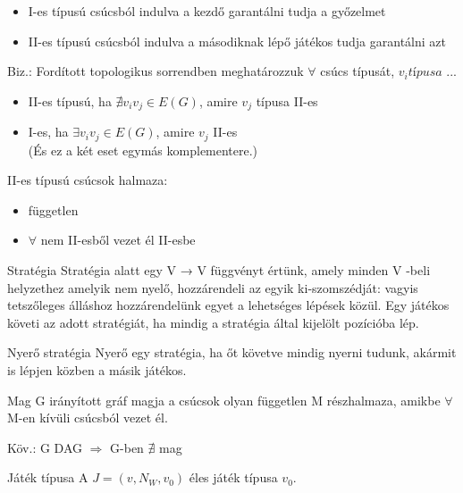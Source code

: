 \begin{itemize}
    \item I-es típusú csúcsból indulva a kezdő garantálni tudja a győzelmet
    \item II-es típusú csúcsból indulva a másodiknak lépő játékos tudja garantálni azt
\end{itemize}

Biz.: Fordított topologikus sorrendben meghatározzuk $\forall$ csúcs típusát,
$v_i típusa$ ...
\begin{itemize}
    \item II-es típusú, ha $\nexists v_iv_j \in E(G)$, amire $v_j$ típusa II-es
    \item  I-es, ha $\exists v_iv_j \in E(G)$, amire $v_j$ II-es\\
    (És ez a két eset egymás komplementere.)
\end{itemize}


\begin{observation}{}{}
    II-es típusú csúcsok halmaza:
    \begin{itemize}
        \item független 
        \item $\forall$ nem II-esből vezet él II-esbe
    \end{itemize}
\end{observation}

\begin{definition}{Stratégia}{}
    Stratégia alatt egy V → V függvényt értünk, amely minden V -beli helyzethez amelyik nem nyelő, hozzárendeli az egyik ki-szomszédját: vagyis tetszőleges álláshoz hozzárendelünk egyet a lehetséges lépések közül. Egy játékos követi az adott stratégiát, ha mindig a stratégia által kijelölt pozícióba lép. 
\end{definition}

\begin{definition}{Nyerő stratégia}{}
    Nyerő egy stratégia, ha őt követve mindig nyerni tudunk, akármit is lépjen közben a másik játékos.
\end{definition}

\begin{definition}{Mag}{}
    G irányított gráf magja a csúcsok olyan független M részhalmaza, amikbe $\forall$ M-en kívüli csúcsból vezet él.
\end{definition}
Köv.: G DAG $\Rightarrow$ G-ben $\nexists$ mag

\begin{definition}{Játék típusa}{}
    A $J = (v, N_W, v_0)$ éles játék típusa $v_0$.
\end{definition}



